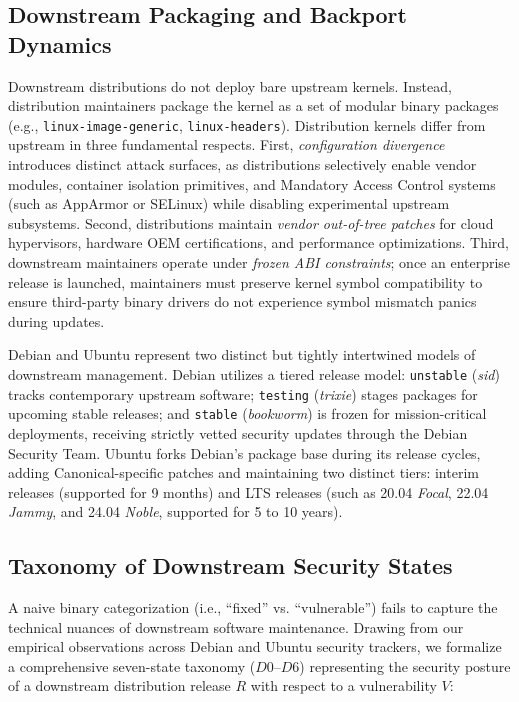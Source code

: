\documentclass[final,5p,times,twocolumn]{elsarticle}
\begin{document}
\subsection{Downstream Packaging and Backport Dynamics}
Downstream distributions do not deploy bare upstream kernels. Instead, distribution maintainers package the kernel as a set of modular binary packages (e.g., \texttt{linux-image-generic}, \texttt{linux-headers}). Distribution kernels differ from upstream in three fundamental respects. First, \textit{configuration divergence} introduces distinct attack surfaces, as distributions selectively enable vendor modules, container isolation primitives, and Mandatory Access Control systems (such as AppArmor or SELinux) while disabling experimental upstream subsystems. Second, distributions maintain \textit{vendor out-of-tree patches} for cloud hypervisors, hardware OEM certifications, and performance optimizations. Third, downstream maintainers operate under \textit{frozen ABI constraints}; once an enterprise release is launched, maintainers must preserve kernel symbol compatibility to ensure third-party binary drivers do not experience symbol mismatch panics during updates.

Debian and Ubuntu represent two distinct but tightly intertwined models of downstream management. Debian utilizes a tiered release model: \texttt{unstable} (\textit{sid}) tracks contemporary upstream software; \texttt{testing} (\textit{trixie}) stages packages for upcoming stable releases; and \texttt{stable} (\textit{bookworm}) is frozen for mission-critical deployments, receiving strictly vetted security updates through the Debian Security Team. Ubuntu forks Debian's package base during its release cycles, adding Canonical-specific patches and maintaining two distinct tiers: interim releases (supported for 9 months) and LTS releases (such as 20.04 \textit{Focal}, 22.04 \textit{Jammy}, and 24.04 \textit{Noble}, supported for 5 to 10 years).

\subsection{Taxonomy of Downstream Security States}
\label{sec:taxonomy}

A naive binary categorization (i.e., ``fixed'' vs. ``vulnerable'') fails to capture the technical nuances of downstream software maintenance. Drawing from our empirical observations across Debian and Ubuntu security trackers, we formalize a comprehensive seven-state taxonomy ($D0$--$D6$) representing the security posture of a downstream distribution release $R$ with respect to a vulnerability $V$:
\end{document}
